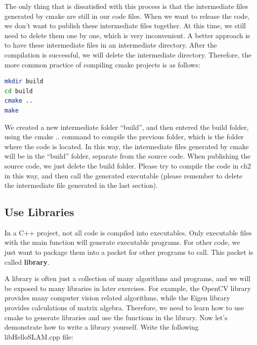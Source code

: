 The only thing that is dissatisfied with this process is that the intermediate files generated by cmake are still in our code files. When we want to release the code, we don't want to publish these intermediate files together. At this time, we still need to delete them one by one, which is very inconvenient. A better approach is to have these intermediate files in an intermediate directory. After the compilation is successful, we will delete the intermediate directory. Therefore, the more common practice of compiling cmake projects is as follows:
\begin{lstlisting}[language=sh,caption=Terminal input]
mkdir build
cd build
cmake ..
make
\end{lstlisting}
We created a new intermediate folder ``build'', and then entered the build folder, using the cmake .. command to compile the previous folder, which is the folder where the code is located. In this way, the intermediate files generated by cmake will be in the ``build'' folder, separate from the source code. When publishing the source code, we just delete the build folder. Please try to compile the code in ch2 in this way, and then call the generated executable (please remember to delete the intermediate file generated in the last section).

\subsection{Use Libraries}
In a C++ project, not all code is compiled into executables. Only executable files with the main function will generate executable programs. For other code, we just want to package them into a packet for other programs to call. This packet is called \textbf{library}.

A library is often just a collection of many algorithms and programs, and we will be exposed to many libraries in later exercises. For example, the OpenCV library provides many computer vision related algorithms, while the Eigen library provides calculations of matrix algebra. Therefore, we need to learn how to use cmake to generate libraries and use the functions in the library. Now let's demonstrate how to write a library yourself. Write the following libHelloSLAM.cpp file:

